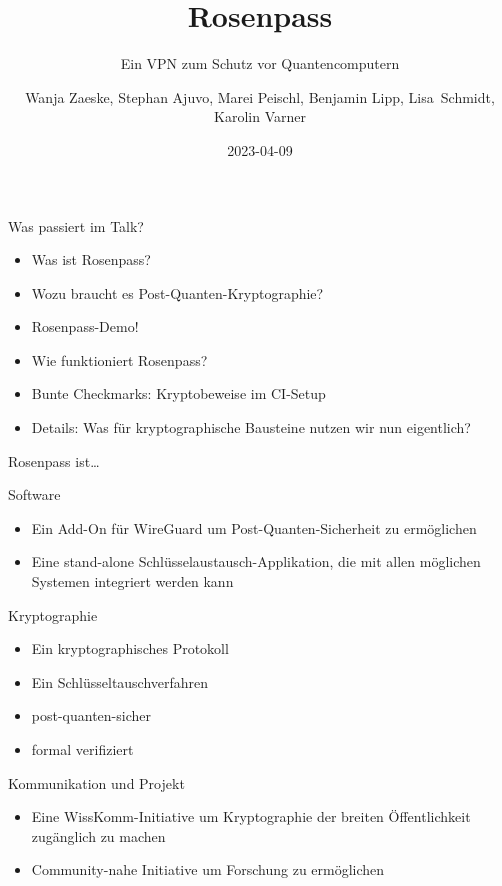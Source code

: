 \documentclass{rosenpass-beamer}
\title{Rosenpass}
\subtitle{Ein VPN zum Schutz vor Quantencomputern}
\author{Wanja Zaeske, Stephan Ajuvo, Marei Peischl, Benjamin Lipp, Lisa~Schmidt, Karolin Varner}
\institute{\url{https://rosenpass.eu}}
\date{2023-04-09}
\begin{document}
\maketitle

\begin{frame}{Was passiert im Talk?}
\begin{itemize}
  \item Was ist Rosenpass?
  \item Wozu braucht es Post-Quanten-Kryptographie?
  \item Rosenpass-Demo!
  \item Wie funktioniert Rosenpass?
  \item Bunte Checkmarks: Kryptobeweise im CI-Setup
  \item Details: Was für kryptographische Bausteine nutzen wir nun eigentlich?
\end{itemize}
\end{frame}

\begin{frame}{Rosenpass ist…}

	Software
\begin{itemize}
  \item Ein Add-On für WireGuard um Post-Quanten-Sicherheit zu ermöglichen
  \item Eine stand-alone Schlüsselaustausch-Applikation, die mit allen möglichen Systemen integriert werden kann
\end{itemize}

Kryptographie
\begin{itemize}
  \item Ein kryptographisches Protokoll
  \item Ein Schlüsseltauschverfahren
  \item post-quanten-sicher
  \item formal verifiziert
\end{itemize}

Kommunikation und Projekt
\begin{itemize}
  \item Eine WissKomm-Initiative um Kryptographie der breiten Öffentlichkeit zugänglich zu machen
  \item Community-nahe Initiative um Forschung zu ermöglichen
\end{itemize}
\end{frame}

\end{document}
